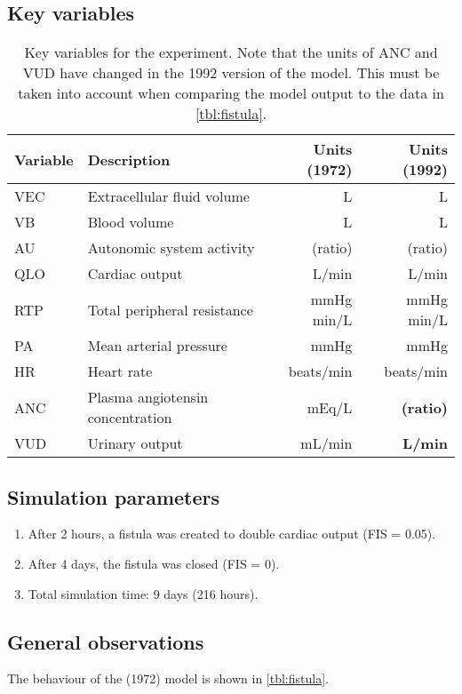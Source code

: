\label{exp:fistula}

\subsection{Key variables}
\begin{table}[!h]
  \centering
  \begin{tabularx}{\textwidth}{lXrr}
    \toprule
    Variable & Description & Units (1972) & Units (1992) \\
    \midrule
    VEC & Extracellular fluid volume & L & L \\
    VB & Blood volume & L & L \\
    AU & Autonomic system activity & (ratio) & (ratio) \\
    QLO & Cardiac output & L/min & L/min \\
    RTP & Total peripheral resistance & mmHg min/L & mmHg min/L \\
    PA & Mean arterial pressure & mmHg & mmHg \\
    HR & Heart rate & beats/min & beats/min \\
    ANC & Plasma angiotensin concentration & mEq/L & \textbf{(ratio)} \\
    VUD & Urinary output & mL/min & \textbf{L/min} \\
    \bottomrule
  \end{tabularx}
  \caption{Key variables for the experiment. Note that the units of ANC and VUD have changed in the 1992 version of the model. This must be taken into account when comparing the model output to the data in \autoref{tbl:fistula}.}
\end{table}

\subsection{Simulation parameters}
\begin{enumerate}
  \item After 2 hours, a fistula was created to double cardiac output (FIS = 0.05).
  \item After 4 days, the fistula was closed (FIS = 0).
  \item Total simulation time: 9 days (216 hours).
\end{enumerate}

\subsection{General observations}
The behaviour of the (1972) model is shown in \autoref{tbl:fistula}.

